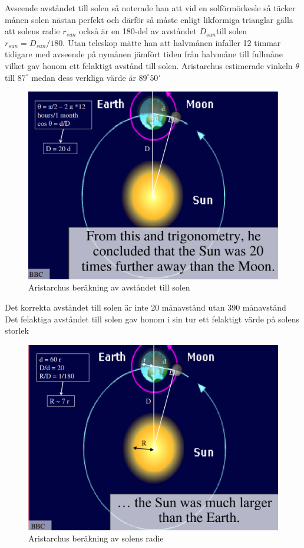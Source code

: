 \documentclass[./exercises.tex]{subfiles}
\begin{document}
Avseende avståndet till solen så noterade han att vid en solförmörkesle så täcker månen solen nästan
perfekt och därför så måste enligt likformiga trianglar gälla att solens radie $r_{sun}$ också är en 180-del av avståndet $D_{sun}$till solen
$r_{sun}=D_{sun}/180$. Utan teleskop mätte han att halvmånen infaller 12 timmar tidigare med avseende på
nymånen jämfört tiden från halvmåne till fullmåne vilket gav honom ett felaktigt avstånd till solen.
Aristarchus estimerade vinkeln $\theta$ till $87^\circ$ medan dess verkliga värde är $89^\circ 50'$
\begin{figure}[H]
\begin{center}
  \includegraphics[scale=0.25]{Sun_distance.png}
  \caption{Aristarchus beräkning av avståndet till solen}
  \end{center}
  \label{fig4}
\end{figure}
Det korrekta avståndet till solen är inte 20 månavstånd utan 390 månavstånd
Det felaktiga avståndet till solen gav honom i sin tur ett felaktigt värde på solens storlek
\begin{figure}[H]
\begin{center}
  \includegraphics[scale=0.25]{Sun_radius.png}
  \caption{Aristarchus beräkning av solens radie}
  \end{center}
  \label{fig4}
\end{figure}
\end{document}
